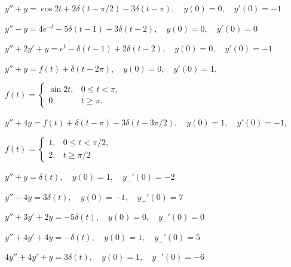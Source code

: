 \begin{exerciselist}
\item\label{exer:8.7.16}$y''+y=\cos2t+2\delta(t-\pi/2)-3\delta(t-\pi), \quad  y(0)=0,\quad y'(0)=-1$

\item\label{exer:8.7.17}\CGex
$y''-y=4e^{-t}-5\delta(t-1)+3\delta(t-2), \quad  y(0)=0,\quad y'(0)=0$

\item\label{exer:8.7.18}$y''+2y'+y=e^t-\delta(t-1)+2\delta(t-2), \quad  y(0)=0,\quad y'(0)=-1$

\item\label{exer:8.7.19}$y''+y=f(t)+\delta(t-2\pi), \quad  y(0)=0,\quad y'(0)=1$, 

$f(t)=\begin{cases}
\sin2t,&0\le t<\pi,\\
0,&t\ge \pi.
\end{cases}$

\item\label{exer:8.7.20}$y''+4y=f(t)+\delta(t-\pi)-3\delta(t-3\pi/2), \quad  y(0)=1,\quad
y'(0)=-1$, 

$f(t)=\begin{cases}
1,&0\le t<\pi/2,\\
2,&t\ge\pi/2
\end{cases}$

\item\label{exer:8.7.21}$y''+y=\delta(t), \quad  y(0)=1,\quad y_-'(0)=-2$

\item\label{exer:8.7.22}$y''-4y=3\delta(t), \quad  y(0)=-1,\quad y_-'(0)=7$

\item\label{exer:8.7.23}$y''+3y'+2y=-5\delta(t), \quad  y(0)=0,\quad y_-'(0)=0$

\item\label{exer:8.7.24}$y''+4y'+4y=-\delta(t), \quad  y(0)=1,\quad y_-'(0)=5$

\item\label{exer:8.7.25}$4y''+4y'+y=3\delta(t), \quad  y(0)=1,\quad y_-'(0)=-6$





\end{exerciselist}
